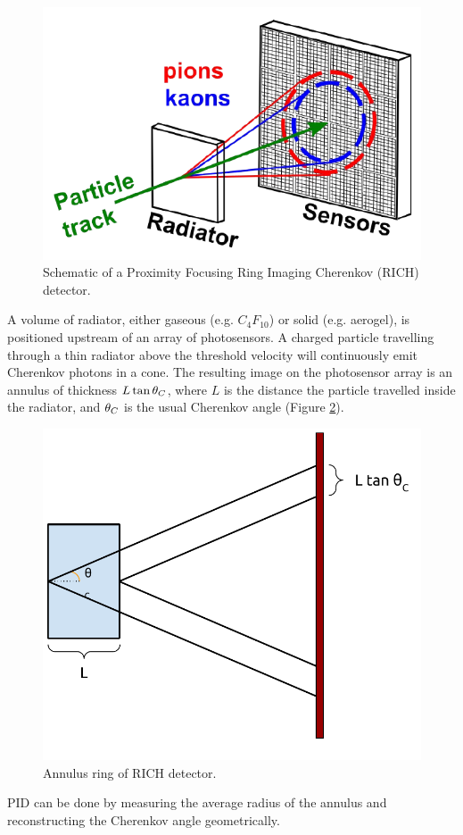 \begin{figure}[ht]
	\centering
	\includegraphics[scale=1]{figures/RICH.pdf}
	\caption{Schematic of a Proximity Focusing Ring Imaging Cherenkov (RICH) detector.}
	\label{fig:richbasics}
\end{figure}
A volume of radiator, either gaseous (e.g. $C_{4}F_{10}$) or solid (e.g. aerogel), is positioned upstream of an array of photosensors. A charged particle travelling through a thin radiator above the threshold velocity will continuously emit Cherenkov photons in a cone. The resulting image on the photosensor array is an annulus of thickness $L\tan\theta_{C}$, where $L$ is the distance the particle travelled inside the radiator, and  $\theta_{C}$ is the usual Cherenkov angle (Figure \ref{fig:richannulus}).
\begin{figure}[ht]
	\centering
	\includegraphics[scale=0.75]{figures/RICH_annulus.pdf}
	\caption{Annulus ring of RICH detector.}
	\label{fig:richannulus}
\end{figure}
PID can be done by measuring the average radius of the annulus and reconstructing the Cherenkov angle geometrically.


